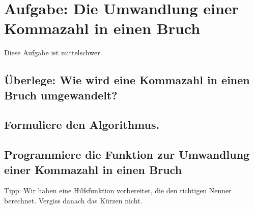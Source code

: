 \section{Aufgabe: Die Umwandlung einer Kommazahl in einen Bruch}

Diese Aufgabe ist mittelschwer.

\subsection{Überlege: Wie wird eine Kommazahl in einen Bruch umgewandelt?}

\subsection{Formuliere den Algorithmus.}

\subsection{Programmiere die Funktion zur Umwandlung einer Kommazahl in einen Bruch}

Tipp: Wir haben eine Hilfsfunktion vorbereitet, die den richtigen Nenner berechnet. Vergiss danach das Kürzen nicht.